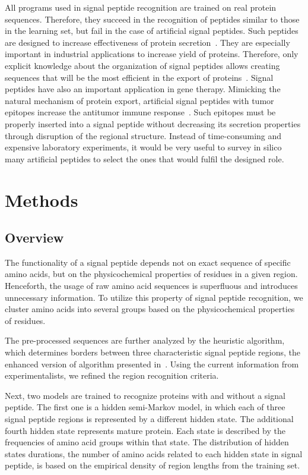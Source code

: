 \documentclass[fleqn,10pt,twoside]{gcb15submission}
\begin{document}
All programs used in signal peptide recognition are trained on real protein sequences. Therefore, they succeed in the recognition of peptides similar to those in the learning set, but fail in the case of artificial signal peptides. Such peptides are designed to increase effectiveness of protein secretion~\citep{2010futatsumorisugaisignal}. They are especially important in industrial applications to increase yield of proteins. Therefore, only explicit knowledge about the organization of signal peptides allows creating sequences that will be the most efficient in the export of proteins~\citep{2013ngengineering}. Signal peptides have also an important application in gene therapy. Mimicking the natural mechanism of protein export, artificial signal peptides with tumor epitopes increase the antitumor immune response~\citep{2003heenhanced}. Such epitopes must be properly inserted into a signal peptide without decreasing its secretion properties through disruption of the regional structure. Instead of time-consuming and expensive laboratory experiments, it would be very useful to survey in silico many artificial peptides to select the ones that would fulfil the designed role.


\section*{Methods}

\subsection*{Overview}

The functionality of a signal peptide depends not on exact sequence of specific amino acids, but on the physicochemical properties of residues in a given region. Henceforth, the usage of raw amino acid sequences is superfluous and introduces unnecessary information. To utilize this property of signal peptide recognition, we cluster amino acids into several groups based on the physicochemical properties of residues.

The pre-processed sequences are further analyzed by the heuristic algorithm, which determines borders between three characteristic signal peptide regions, the enhanced version of algorithm presented in~\cite{1998nielsenprediction}. Using the current information from experimentalists, we refined the region recognition criteria.

Next, two models are trained to recognize proteins with and without a signal peptide. The first one is a hidden semi-Markov model, in which each of three signal peptide regions is represented by a different hidden state. The additional fourth hidden state represents mature protein. Each state is described by the frequencies of amino acid groups  within that state. The distribution of hidden states durations, the number of amino acids related to each hidden state in signal peptide, is based on the empirical density of region lengths from the training set. 
\end{document}

